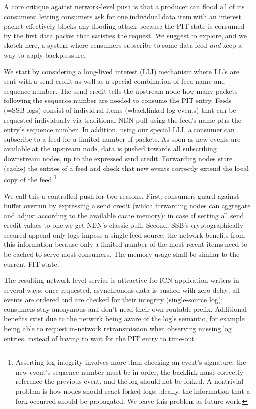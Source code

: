 \documentclass[9pt,sigconf]{acmart}
\begin{document}
A core critique against network-level push is that a producer can
flood all of its consumers: letting consumers ask for one individual
data item with an interest packet effectively blocks any flooding
attack because the PIT state is consumed by the first data packet that
satisfies the request. We suggest to explore, and we sketch here, a
system where consumers subscribe to some data feed {\em and} keep a
way to apply backpressure.

We start by considering a long-lived interest (LLI) mechanism where LLIs are
sent with a send credit as well as a special combination of feed name and
sequence number. The send credit tells the upstream node how many packets
following the sequence number are needed to consume the PIT entry.  Feeds (=SSB
logs) consist of individual items (=backlinked log events) that can be
requested individually via traditional NDN-pull using the feed's name plus the
entry's sequence number. In addition, using our special LLI, a
consumer can subscribe to a feed for a limited number of packets. As
soon as new events are available at the upstream node, data is pushed
towards all subscribing downstream nodes, up to the expressed send
credit. Forwarding nodes store (cache) the entries of a feed and check
that new events correctly extend the local copy of the feed.\footnote{
  Asserting log integrity involves more than checking an event's
  signature: the new event's sequence number must be in order, the
  backlink must correctly reference the previous event, and the log
  should not be forked. A nontrivial problem is how nodes should react
  forked logs: ideally, the information that a fork occurred should be
  propagated. We leave this problem as future work.}

We call this a controlled push for two reasons. First, consumers
guard against buffer overrun by expressing a send credit (which
forwarding nodes can aggregate and adjust according to the available
cache memory): in case of setting all send credit values to one we get
NDN's classic pull. Second, SSB's cryptographically secured
append-only logs impose a single feed source: the network benefits
from this information because only a limited number of the most recent
items need to be cached to serve most consumers. The memory usage
shall be similar to the current PIT state.

The resulting network-level service is attractive for ICN application
writers in several ways: once requested, asynchronous data is pushed
with zero delay; all events are ordered and are checked for their
integrity (single-source log); consumers stay anonymous and don't need
their own routable prefix. Additional benefits exist due to the
network being aware of the log's semantic, for example being able to
request in-network retransmission when observing missing log entries,
instead of having to wait for the PIT entry to time-out.
\end{document}
